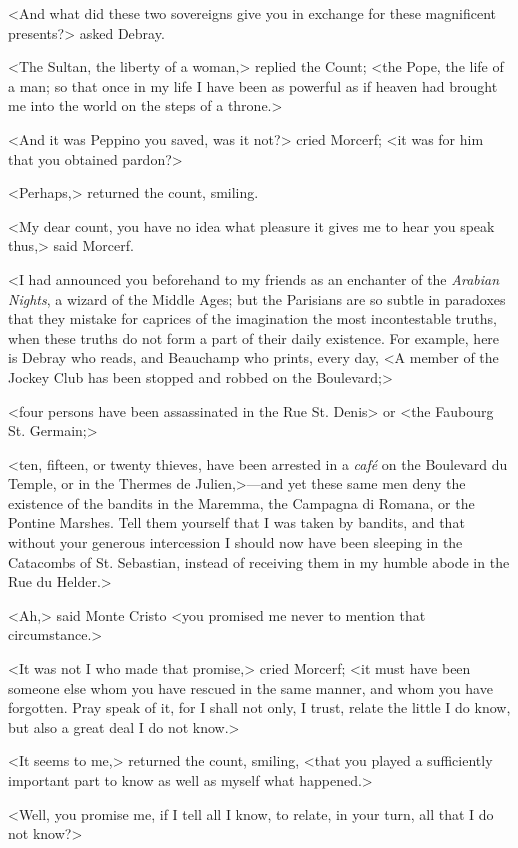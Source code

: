  <And what did these two sovereigns give you in exchange for these magnificent presents?> asked Debray. 

 <The Sultan, the liberty of a woman,> replied the Count; <the Pope, the life of a man; so that once in my life I have been as powerful as if heaven had brought me into the world on the steps of a throne.> 

 <And it was Peppino you saved, was it not?> cried Morcerf; <it was for him that you obtained pardon?> 

 <Perhaps,> returned the count, smiling. 

 <My dear count, you have no idea what pleasure it gives me to hear you speak thus,> said Morcerf. 
 
 <I had announced you beforehand to my friends as an enchanter of the \textit{Arabian Nights}, a wizard of the Middle Ages; but the Parisians are so subtle in paradoxes that they mistake for caprices of the imagination the most incontestable truths, when these truths do not form a part of their daily existence. For example, here is Debray who reads, and Beauchamp who prints, every day, <A member of the Jockey Club has been stopped and robbed on the Boulevard;>

<four persons have been assassinated in the Rue St. Denis> or <the Faubourg St. Germain;>

<ten, fifteen, or twenty thieves, have been arrested in a \textit{café} on the Boulevard du Temple, or in the Thermes de Julien,>—and yet these same men deny the existence of the bandits in the Maremma, the Campagna di Romana, or the Pontine Marshes. Tell them yourself that I was taken by bandits, and that without your generous intercession I should now have been sleeping in the Catacombs of St. Sebastian, instead of receiving them in my humble abode in the Rue du Helder.> 

 <Ah,> said Monte Cristo <you promised me never to mention that circumstance.> 

 <It was not I who made that promise,> cried Morcerf; <it must have been someone else whom you have rescued in the same manner, and whom you have forgotten. Pray speak of it, for I shall not only, I trust, relate the little I do know, but also a great deal I do not know.> 

 <It seems to me,> returned the count, smiling, <that you played a sufficiently important part to know as well as myself what happened.>

<Well, you promise me, if I tell all I know, to relate, in your turn, all that I do not know?> 

